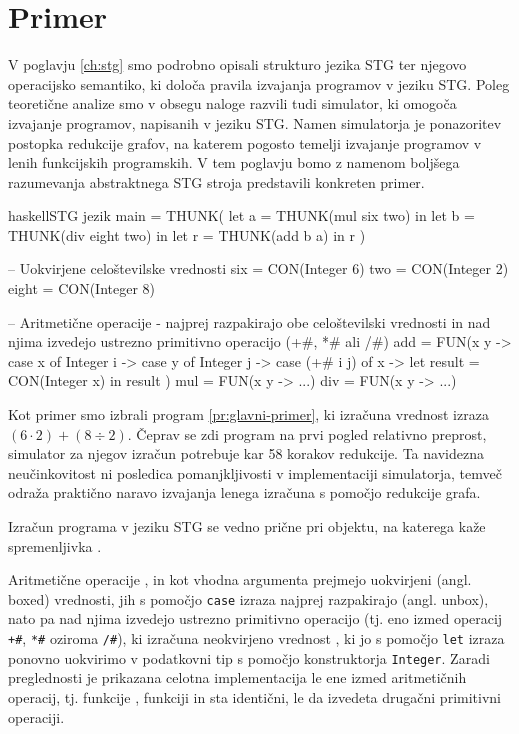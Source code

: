 \section{Primer}
\label{sec:stg-primer}

V poglavju \ref{ch:stg} smo podrobno opisali strukturo jezika STG ter njegovo operacijsko semantiko, ki določa pravila izvajanja programov v jeziku STG. Poleg teoretične analize smo v obsegu naloge razvili tudi simulator, ki omogoča izvajanje programov, napisanih v jeziku STG. Namen simulatorja je ponazoritev postopka redukcije grafov, na katerem pogosto temelji izvajanje programov v lenih funkcijskih programskih. V tem poglavju bomo z namenom boljšega razumevanja abstraktnega STG stroja predstavili konkreten primer.

\begin{primer}[htbp]
\centering
\begin{code-box}{haskell}{STG jezik \cmark}
main = THUNK(
	let a = THUNK(mul six two) in
	let b = THUNK(div eight two) in
	let r = THUNK(add b a) in
		r
)

-- Uokvirjene celoštevilske vrednosti
six = CON(Integer 6)
two = CON(Integer 2)
eight = CON(Integer 8)

-- Aritmetične operacije - najprej razpakirajo obe celoštevilski vrednosti in nad njima izvedejo ustrezno primitivno operacijo (+#, *# ali /#)
add = FUN(x y ->
	case x of {
		Integer i -> case y of {
			Integer j -> case (+# i j) of {
				x -> let result = CON(Integer x) in
                         result
			}
		}
	}
)
mul = FUN(x y -> ...)
div = FUN(x y -> ...)
\end{code-box}
\caption{STG program, ki izračuna vrednost izraza $(6 \cdot 2) + (8 \div 2)$}
\label{pr:glavni-primer}
\end{primer}

Kot primer smo izbrali program \ref{pr:glavni-primer}, ki izračuna vrednost izraza $(6 \cdot 2) + (8 \div 2)$. Čeprav se zdi program na prvi pogled relativno preprost, simulator za njegov izračun potrebuje kar 58 korakov redukcije. Ta navidezna neučinkovitost ni posledica pomanjkljivosti v implementaciji simulatorja, temveč odraža praktično naravo izvajanja lenega izračuna s pomočjo redukcije grafa.

Izračun programa v jeziku STG se vedno prične pri objektu, na katerega kaže spremenljivka .

Aritmetične operacije ,  in  kot vhodna argumenta prejmejo uokvirjeni (angl. boxed) vrednosti, jih s pomočjo \texttt{case} izraza najprej razpakirajo (angl. unbox), nato pa nad njima izvedejo ustrezno primitivno operacijo (tj. eno izmed operacij \texttt{+\#}, \texttt{*\#} oziroma \texttt{/\#}), ki izračuna neokvirjeno vrednost , ki jo s pomočjo \texttt{let} izraza ponovno uokvirimo v podatkovni tip s pomočjo konstruktorja \texttt{Integer}. Zaradi preglednosti je prikazana celotna implementacija le ene izmed aritmetičnih operacij, tj. funkcije , funkciji  in  sta identični, le da izvedeta drugačni primitivni operaciji.

